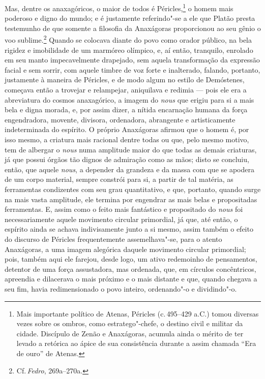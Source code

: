 Mas, dentre os anaxagóricos, o maior de todos é Péricles,\footnote{ Mais
importante político de Atenas, Péricles (c.\,495--429 a.C.) tomou diversas
vezes sobre os ombros, como estratego"-chefe, o destino civil e militar da
cidade. Discípulo de Zenão e Anaxágoras, acumula ainda o mérito de ter levado
a retórica ao ápice de sua consistência durante a assim chamada ``Era de
ouro'' de Atenas.} o homem mais poderoso e digno do mundo; e é justamente
referindo"-se a ele que Platão presta testemunho de que somente a filosofia
da Anaxágoras proporcionou ao seu gênio o voo sublime.\footnote{Cf.\,\textit{Fedro}, 
269a--270a.} Quando se colocava diante do povo como orador público,
na bela rigidez e imobilidade de um marmóreo olímpico, e, aí então,
tranquilo, enrolado em seu manto impecavelmente drapejado, sem aquela
transformação da expressão facial e sem sorrir, com aquele timbre de voz
forte e inalterado, falando, portanto, justamente à maneira de Péricles, e de
modo algum no estilo de Demóstenes, começava então a trovejar e relampejar,
aniquilava e redimia --- pois ele era a abreviatura do cosmos anaxagórico, a
imagem do \textit{nous} que erigiu para si a mais bela e digna morada, e, por
assim dizer, a nítida encarnação humana da força engendradora, movente,
divisora, ordenadora, abrangente e artisticamente indeterminada do espírito.
O próprio Anaxágoras afirmou que o homem é, por isso mesmo, a criatura mais
racional dentre todas ou que, pelo mesmo motivo, tem de albergar o \textit{nous} 
numa amplitude maior do que todas as demais criaturas, já que
 possui órgãos tão dignos de admiração como as mãos; disto se concluiu,
 então, que aquele \textit{nous}, a depender da grandeza e da massa com que
 se apodera de um corpo material, sempre constrói para si, a partir de tal
 matéria, as ferramentas condizentes com seu grau quantitativo, e que,
 portanto, quando surge na mais vasta amplitude, ele termina por engendrar as
 mais belas e propositadas ferramentas. E, assim como o feito mais fantástico
 e propositado do \textit{nous} foi necessariamente aquele movimento circular
 primordial, já que, até então, o espírito ainda se achava indivisamente
 junto a si mesmo, assim também o efeito do discurso de Péricles
 frequentemente assemelhava"-se, para o atento Anaxágoras, a uma imagem
 alegórica daquele movimento circular primordial; pois, também aqui ele
 farejou, desde logo, um ativo redemoinho de pensamentos, detentor de uma
 força assustadora, mas ordenada, que, em círculos concêntricos, apreendia e
 dilacerava o mais próximo e o mais distante e que, quando chegava a seu fim,
 havia redimensionado o povo inteiro, ordenando"-o e dividindo"-o.

